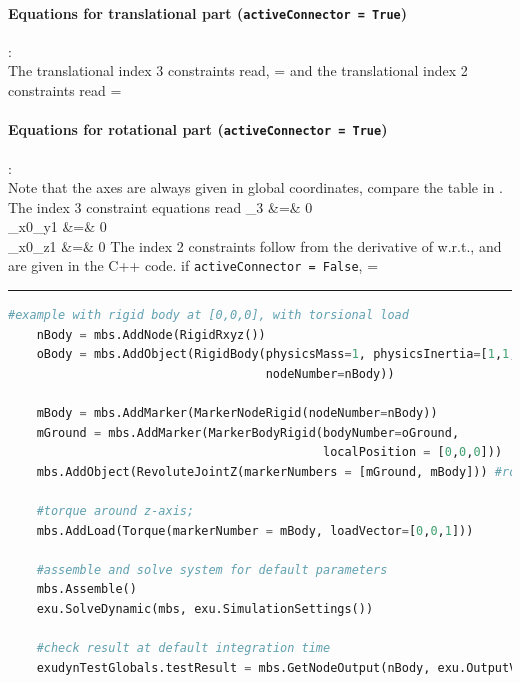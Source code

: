     \paragraph{Equations for translational part (\texttt{activeConnector = True})}:\\
    The translational index 3 constraints read,
    \be
       = \Null
    \ee
    and the translational index 2 constraints read
    \be
       = \Null    
    \ee
    \paragraph{Equations for rotational part (\texttt{activeConnector = True})}:\\
    Note that the axes are always given in global coordinates, compare the table in .
    The index 3 constraint equations read
    \bea \label{eq:ObjectJointRevoluteZ:index3}
       \lambda_3 &=& 0 \\
       _{x0}\tp {}_{y1} &=& 0 \\
       _{x0}\tp {}_{z1} &=& 0
    \eea
    The index 2 constraints follow from the derivative of  w.r.t., and are given in the C++ code.
%    
    if \texttt{activeConnector = False}, 
    \be
      \zv = \Null
    \ee
\vspace{6pt}\par\noindent\rule{\textwidth}{0.4pt}
\label{miniExample_ObjectJointRevoluteZ}
\pythonstyle
\begin{lstlisting}[language=Python, firstnumber=1]
    #example with rigid body at [0,0,0], with torsional load
    nBody = mbs.AddNode(RigidRxyz())
    oBody = mbs.AddObject(RigidBody(physicsMass=1, physicsInertia=[1,1,1,0,0,0], 
                                    nodeNumber=nBody))
    
    mBody = mbs.AddMarker(MarkerNodeRigid(nodeNumber=nBody))
    mGround = mbs.AddMarker(MarkerBodyRigid(bodyNumber=oGround, 
                                            localPosition = [0,0,0]))
    mbs.AddObject(RevoluteJointZ(markerNumbers = [mGround, mBody])) #rotation around ground Z-axis

    #torque around z-axis; 
    mbs.AddLoad(Torque(markerNumber = mBody, loadVector=[0,0,1])) 

    #assemble and solve system for default parameters
    mbs.Assemble()
    exu.SolveDynamic(mbs, exu.SimulationSettings())
    
    #check result at default integration time
    exudynTestGlobals.testResult = mbs.GetNodeOutput(nBody, exu.OutputVariableType.Rotation)[2]

\end{lstlisting}

